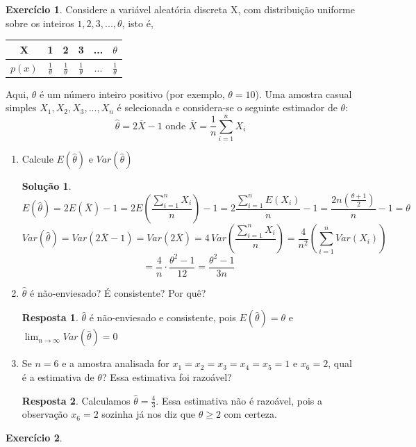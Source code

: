 \documentclass[12pt,a4paper]{article}
\theoremstyle{definition}
\newtheorem{exercise}{Exercício}
\newtheorem*{solution}{Solução}
\newtheorem*{answer}{Resposta}
\begin{document}
\begin{exercise}
Considere a variável aleatória discreta X, com distribuição uniforme sobre os inteiros $1, 2, 3,..., \theta$, isto é, 
\begin{center}
    \begin{tabular}{c|c|c|c|c|c}
    \hline
        X &1&2&3&...&$\theta$  \\
        \hline
         $p(x)$&$\frac{1}{\theta}$&$\frac{1}{\theta}$&$\frac{1}{\theta}$&$...$&$\frac{1}{\theta}$\\
    \hline
    \end{tabular}
\end{center}
Aqui, $\theta$ é um número inteiro positivo (por exemplo, $\theta = 10$). Uma amostra casual simples $X_1, X_2, X_3,..., X_n$ é selecionada e considera-se o seguinte estimador de $\theta$: $$\hat{\theta}= 2\overline{X}-1 \text{ onde 
 }\overline{X} = \frac{1}{n} \sum_{i=1}^{n}X_{i} $$
\begin{enumerate}
\item
Calcule $E(\hat{\theta})$ e $Var(\hat{\theta})$
\begin{solution}
$$
E(\hat{\theta}) = 2E(\overline{X}) - 1 = 2E\left(\frac{\sum_{i=1}^{n}{X_i}}{n}\right) - 1 = 2\frac{\sum_{i=1}^{n}E(X_i)}{n} - 1 = \frac{2n\left(\frac{\theta+1}{2}\right)}{n}-1 = \theta$$
$$
Var(\hat{\theta}) = Var(2\overline{X}-1) = Var(2\overline{X}) = 4\, Var\left(\frac{\sum_{i=1}^{n}{X_i}}{n}\right) = \frac{4}{n^{2}}\left(\sum_{i=1}^{n}Var(X_i)\right)
$$
$$
= \frac{4}{n} \cdot \frac{\theta^{2}-1}{12} = \frac{\theta^{2}-1}{3n}
$$
\end{solution}
\item 
$\hat{\theta}$ é não-enviesado? É consistente? Por quê?
\begin{answer}
$\hat{\theta}$ é não-enviesado e consistente, pois $E(\hat{\theta}) = \theta$ e $\lim_{n\to\infty} Var(\hat{\theta}) = 0$
\end{answer}
\item 
Se $n = 6$ e a amostra analisada for $x_1 = x_2 = x_3 = x_4 = x_5 = 1$ e $x_6 = 2$, qual é a estimativa de $\theta$?
Essa estimativa foi razoável?
\begin{answer}
Calculamos
$\hat{\theta} = \frac{4}{3}$.
Essa estimativa não é razoável, pois a observação $x_6=2$ sozinha já nos diz que $\theta \geq 2$ com certeza.
\end{answer}
\end{enumerate}
\end{exercise}

\begin{exercise}
\end{exercise}
\end{document}
